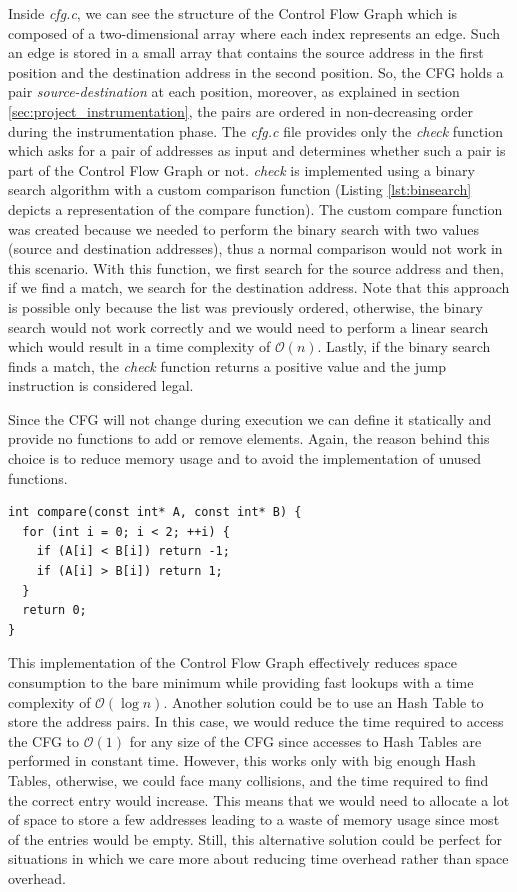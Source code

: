 Inside \textit{cfg.c}, we can see the structure of the Control Flow Graph which
is composed of a two-dimensional array where each index represents an edge. Such
an edge is stored in a small array that contains the source address in the first
position and the destination address in the second position. So, the CFG holds a
pair \textit{source-destination} at each position, moreover, as explained in
section \ref{sec:project_instrumentation}, the pairs are ordered in non-decreasing
order during the instrumentation phase. The \textit{cfg.c} file provides only the
\textit{check} function which asks for a pair of addresses as input and
determines whether such a pair is part of the Control Flow Graph or not. \textit{check}
is implemented using a binary search algorithm with a custom comparison function
(Listing \ref{lst:binsearch} depicts a representation of the compare function). The
custom compare function was created because we needed to perform the binary search
with two values (source and destination addresses), thus a normal comparison
would not work in this scenario. With this function, we first search for the
source address and then, if we find a match, we search for the destination
address. Note that this approach is possible only because the list was previously
ordered, otherwise, the binary search would not work correctly and we would need
to perform a linear search which would result in a time complexity of $\mathcal{O}
(n)$. Lastly, if the binary search finds a match, the \textit{check} function returns
a positive value and the jump instruction is considered legal.

Since the CFG will not change during execution we can define it statically and provide
no functions to add or remove elements. Again, the reason behind this choice is to
reduce memory usage and to avoid the implementation of unused functions. \\
\begin{lstlisting}[style=CStyle, caption= Comparison function for binary search, label={lst:binsearch}]
int compare(const int* A, const int* B) {
  for (int i = 0; i < 2; ++i) {
    if (A[i] < B[i]) return -1;
    if (A[i] > B[i]) return 1;
  }
  return 0;
}
\end{lstlisting}

This implementation of the Control Flow Graph effectively reduces space consumption
to the bare minimum while providing fast lookups with a time complexity of $\mathcal{O}
(\log{n})$. Another solution could be to use an Hash Table to store the address
pairs. In this case, we would reduce the time required to access the CFG to
$\mathcal{O}(1)$ for any size of the CFG since accesses to Hash Tables are
performed in constant time. However, this works only with big enough Hash Tables,
otherwise, we could face many collisions, and the time required to find the correct
entry would increase. This means that we would need to allocate a lot of space
to store a few addresses leading to a waste of memory usage since most of the
entries would be empty. Still, this alternative solution could be perfect for
situations in which we care more about reducing time overhead rather than space
overhead.

